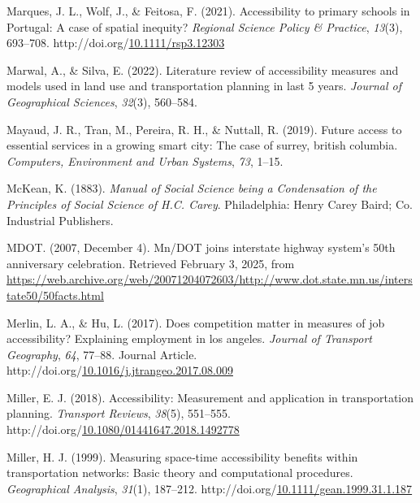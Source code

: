 \documentclass[
11pt, %
oneside, %
english, %
singlespacing, %
]{macthesis} %
\newlength{\cslhangindent}
\newenvironment{CSLReferences}[2] %
{\begin{list}{}{%
	\setlength{\itemindent}{0pt}
	\setlength{\leftmargin}{0pt}
	\setlength{\parsep}{0pt}
	\ifodd #1
	\setlength{\leftmargin}{\cslhangindent}
	\setlength{\itemindent}{-1\cslhangindent}
	\fi
	\setlength{\itemsep}{#2\baselineskip}}}
{\end{list}}
\begin{document}
\begin{CSLReferences}{1}{0}
Marques, J. L., Wolf, J., \& Feitosa, F. (2021). Accessibility to primary schools in {Portugal}: A case of spatial inequity? \emph{Regional Science Policy \& Practice}, \emph{13}(3), 693--708. http://doi.org/\href{https://doi.org/10.1111/rsp3.12303}{10.1111/rsp3.12303}

Marwal, A., \& Silva, E. (2022). Literature review of accessibility measures and models used in land use and transportation planning in last 5 years. \emph{Journal of Geographical Sciences}, \emph{32}(3), 560--584.

Mayaud, J. R., Tran, M., Pereira, R. H., \& Nuttall, R. (2019). Future access to essential services in a growing smart city: The case of surrey, british columbia. \emph{Computers, Environment and Urban Systems}, \emph{73}, 1--15.

McKean, K. (1883). \emph{Manual of {Social} {Science} being a {Condensation} of the {Principles} of {Social} {Science} of {H}.{C}. {Carey}}. Philadelphia: Henry Carey Baird; Co. Industrial Publishers.

MDOT. (2007, December 4). Mn/{DOT} joins interstate highway system's 50th anniversary celebration. Retrieved February 3, 2025, from \url{https://web.archive.org/web/20071204072603/http://www.dot.state.mn.us/interstate50/50facts.html}

Merlin, L. A., \& Hu, L. (2017). Does competition matter in measures of job accessibility? Explaining employment in los angeles. \emph{Journal of Transport Geography}, \emph{64}, 77--88. Journal Article. http://doi.org/\href{https://doi.org/10.1016/j.jtrangeo.2017.08.009}{10.1016/j.jtrangeo.2017.08.009}

Miller, E. J. (2018). Accessibility: Measurement and application in transportation planning. \emph{Transport Reviews}, \emph{38}(5), 551--555. http://doi.org/\href{https://doi.org/10.1080/01441647.2018.1492778}{10.1080/01441647.2018.1492778}

Miller, H. J. (1999). Measuring space‐time accessibility benefits within transportation networks: Basic theory and computational procedures. \emph{Geographical Analysis}, \emph{31}(1), 187--212. http://doi.org/\href{https://doi.org/10.1111/gean.1999.31.1.187}{10.1111/gean.1999.31.1.187}


\end{CSLReferences}
\end{document}
